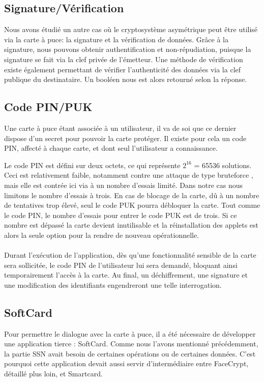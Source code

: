\documentclass[a4paper,11pt,french]{article}
\begin{document}
\subsection{Signature/Vérification}
Nous avons étudié un autre cas où le cryptosystème asymétrique peut être utilisé
via la carte à puce: la signature et la vérification de données. Grâce à la 
signature, nous pouvons obtenir authentification et non-répudiation, puisque la
signature se fait via la clef privée de l'émetteur. Une méthode de vérification
existe également permettant de vérifier l'authenticité des données via la clef 
publique du destinataire. Un booléen nous est alors retourné selon la réponse.

\label{Code PIN}
\subsection{Code PIN/PUK}
Une carte à puce étant associée à un utilisateur, il va de soi que ce dernier 
dispose d'un secret pour pouvoir la carte protéger. Il existe pour cela un code 
PIN, affecté à chaque carte, et dont seul l'utilisateur a connaissance.

Le code PIN est défini sur deux octets, ce qui représente $2^{16}$ = 65536 solutions.
Ceci est relativement faible, notamment contre une attaque de type 
\og{}bruteforce \fg{}, mais elle est contrée ici via à un nombre d'essais limité.
Dans notre cas nous limitons le nombre d'essais à trois. En cas de blocage de la
carte, dû à un nombre de tentatives trop élevé, seul le code PUK pourra 
débloquer la carte. Tout comme le code PIN, le nombre d'essais pour entrer le 
code PUK est de trois. Si ce nombre est dépassé la carte devient inutilisable et
la réinstallation des applets est alors la seule option pour la rendre
de nouveau opérationnelle.

\paragraph{}
Durant l'exécution de l'application, dès qu'une fonctionnalité sensible de la 
carte sera sollicitée, le code PIN de l'utilisateur lui sera demandé, bloquant 
ainsi temporairement l'accès à la carte. Au final, un déchiffrement, une signature
et une modification des identifiants engendreront une telle interrogation.

\subsection{SoftCard}
Pour permettre le dialogue avec la carte à puce, il a été nécessaire de développer
une application tierce : SoftCard. Comme nous l'avons mentionné précédemment,
la partie SSN avait besoin de certaines opérations ou de certaines données. 
C'est pourquoi cette application devait aussi servir d'intermédiaire entre 
FaceCrypt, détaillé plus loin, et Smartcard.
\end{document}
